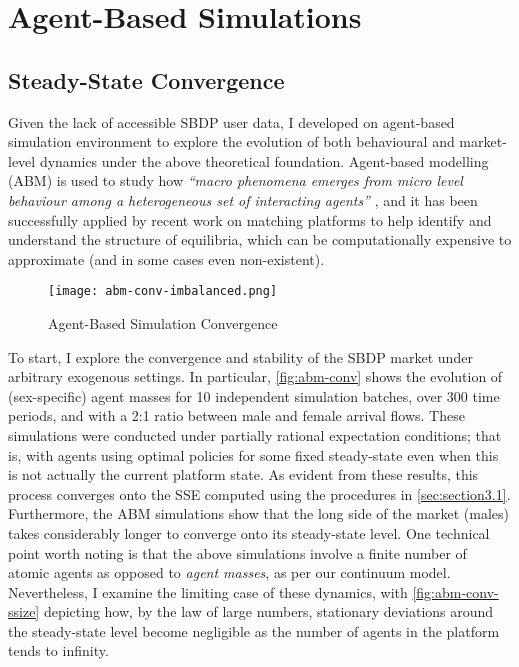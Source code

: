 \section{Agent-Based Simulations}
\label{sec:section4}  
\subsection{Steady-State Convergence}
Given the lack of accessible SBDP user data, I developed on agent-based simulation environment to explore the evolution of both behavioural and market-level dynamics under the above theoretical foundation. 
Agent-based modelling (ABM) is used to study how \textit{``macro phenomena emerges from micro level behaviour among a heterogeneous set of interacting agents''} \citep{janssen2005agent}, and it has been successfully applied by recent work on matching platforms \citep{immorlica2021designing} to help identify and understand the structure of equilibria, which can be computationally expensive to approximate (and in some cases even non-existent).

\begin{figure}[ht]
    \centering
    \caption{Agent-Based Simulation Convergence}
    \texttt{[image: abm-conv-imbalanced.png]}
    \label{fig:abm-conv} 
\end{figure}

To start, I explore the convergence and stability of the SBDP market under arbitrary exogenous settings. 
In particular, \autoref{fig:abm-conv} shows the evolution of (sex-specific) agent masses for 10 independent simulation batches, over 300 time periods, and with a 2:1 ratio between male and female arrival flows. 
These simulations were conducted under partially rational expectation conditions; that is, with agents using optimal policies for some fixed steady-state even when this is not actually the current platform state.  
As evident from these results, this process converges onto the SSE computed using the procedures in \autoref{sec:section3.1}. 
Furthermore, the ABM simulations show that the long side of the market (males) takes considerably longer to converge onto its steady-state level. 
One technical point worth noting is that the above simulations involve a finite number of atomic agents as opposed to \textit{agent masses}, as per our continuum model.  
Nevertheless, I examine the limiting case of these dynamics, with \autoref{fig:abm-conv-ssize} depicting how, by the law of large numbers, stationary deviations around the steady-state level become negligible as the number of agents in the platform tends to infinity. 

